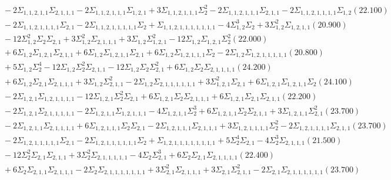 \documentclass[12pt]{article}
\begin{document}
\begin{landscape}
\begin{align*}
		&\quad\quad -2\Sigma_{1,1,2,1,1}\Sigma_{2,1,1,1}-2\Sigma_{1,1,2,1,1,1}\Sigma_{1,2,1}+3\Sigma_{1,1,2,1,1,1}\Sigma_{2}^{2}-2\Sigma_{1,1,2,1,1,1}\Sigma_{2,1,1}-2\Sigma_{1,1,2,1,1,1,1}\Sigma_{1,2}(22.100) \\ 
		&\quad\quad -2\Sigma_{1,1,2,1,1,1,1}\Sigma_{2,1}-2\Sigma_{1,1,2,1,1,1,1,1}\Sigma_{2}+\Sigma_{1,1,2,1,1,1,1,1,1,1}-4\Sigma_{1,2}^{3}\Sigma_{2}+3\Sigma_{1,2}^{2}\Sigma_{1,2,1,1}(20.900) \\ 
		&\quad\quad -12\Sigma_{1,2}^{2}\Sigma_{2}\Sigma_{2,1}+3\Sigma_{1,2}^{2}\Sigma_{2,1,1,1}+3\Sigma_{1,2}\Sigma_{1,2,1}^{2}-12\Sigma_{1,2}\Sigma_{1,2,1}\Sigma_{2}^{2}(22.000) \\ 
		&\quad\quad +6\Sigma_{1,2}\Sigma_{1,2,1}\Sigma_{2,1,1}+6\Sigma_{1,2}\Sigma_{1,2,1,1}\Sigma_{2,1}+6\Sigma_{1,2}\Sigma_{1,2,1,1,1}\Sigma_{2}-2\Sigma_{1,2}\Sigma_{1,2,1,1,1,1,1}(20.800) \\ 
		&\quad\quad +5\Sigma_{1,2}\Sigma_{2}^{4}-12\Sigma_{1,2}\Sigma_{2}^{2}\Sigma_{2,1,1}-12\Sigma_{1,2}\Sigma_{2}\Sigma_{2,1}^{2}+6\Sigma_{1,2}\Sigma_{2}\Sigma_{2,1,1,1,1}(24.200) \\ 
		&\quad\quad +6\Sigma_{1,2}\Sigma_{2,1}\Sigma_{2,1,1,1}+3\Sigma_{1,2}\Sigma_{2,1,1}^{2}-2\Sigma_{1,2}\Sigma_{2,1,1,1,1,1,1}+3\Sigma_{1,2,1}^{2}\Sigma_{2,1}+6\Sigma_{1,2,1}\Sigma_{1,2,1,1}\Sigma_{2}(24.100) \\ 
		&\quad\quad -2\Sigma_{1,2,1}\Sigma_{1,2,1,1,1,1}-12\Sigma_{1,2,1}\Sigma_{2}^{2}\Sigma_{2,1}+6\Sigma_{1,2,1}\Sigma_{2}\Sigma_{2,1,1,1}+6\Sigma_{1,2,1}\Sigma_{2,1}\Sigma_{2,1,1}(22.200) \\ 
		&\quad\quad -2\Sigma_{1,2,1}\Sigma_{2,1,1,1,1,1}-2\Sigma_{1,2,1,1}\Sigma_{1,2,1,1,1}-4\Sigma_{1,2,1,1}\Sigma_{2}^{3}+6\Sigma_{1,2,1,1}\Sigma_{2}\Sigma_{2,1,1}+3\Sigma_{1,2,1,1}\Sigma_{2,1}^{2}(23.700) \\ 
		&\quad\quad -2\Sigma_{1,2,1,1}\Sigma_{2,1,1,1,1}+6\Sigma_{1,2,1,1,1}\Sigma_{2}\Sigma_{2,1}-2\Sigma_{1,2,1,1,1}\Sigma_{2,1,1,1}+3\Sigma_{1,2,1,1,1,1}\Sigma_{2}^{2}-2\Sigma_{1,2,1,1,1,1}\Sigma_{2,1,1}(23.700) \\ 
		&\quad\quad -2\Sigma_{1,2,1,1,1,1,1}\Sigma_{2,1}-2\Sigma_{1,2,1,1,1,1,1,1}\Sigma_{2}+\Sigma_{1,2,1,1,1,1,1,1,1,1}+5\Sigma_{2}^{4}\Sigma_{2,1}-4\Sigma_{2}^{3}\Sigma_{2,1,1,1}(21.500) \\ 
		&\quad\quad -12\Sigma_{2}^{2}\Sigma_{2,1}\Sigma_{2,1,1}+3\Sigma_{2}^{2}\Sigma_{2,1,1,1,1,1}-4\Sigma_{2}\Sigma_{2,1}^{3}+6\Sigma_{2}\Sigma_{2,1}\Sigma_{2,1,1,1,1}(22.400) \\ 
		&\quad\quad +6\Sigma_{2}\Sigma_{2,1,1}\Sigma_{2,1,1,1}-2\Sigma_{2}\Sigma_{2,1,1,1,1,1,1,1}+3\Sigma_{2,1}^{2}\Sigma_{2,1,1,1}+3\Sigma_{2,1}\Sigma_{2,1,1}^{2}-2\Sigma_{2,1}\Sigma_{2,1,1,1,1,1,1}(23.700) \\ 

\end{align*}
\end{landscape}
\end{document}
